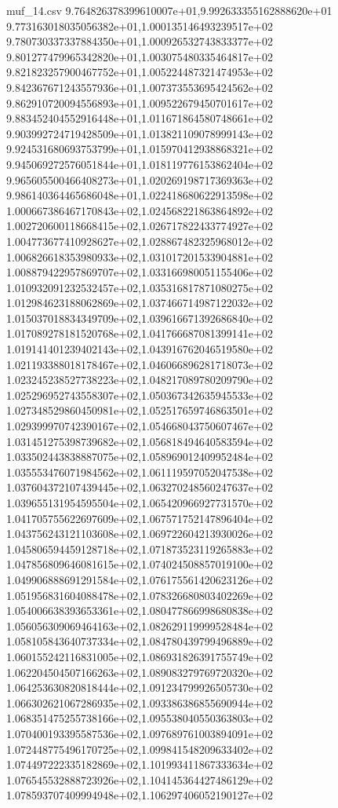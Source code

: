 \begin{filecontents*}{muf_14.csv}
9.764826378399610007e+01,9.992633355162888620e+01
9.773163018035056382e+01,1.000135146493239517e+02
9.780730337337884350e+01,1.000926532743833377e+02
9.801277479965342820e+01,1.003075480335464817e+02
9.821823257900467752e+01,1.005224487321474953e+02
9.842367671243557936e+01,1.007373553695424562e+02
9.862910720094556893e+01,1.009522679450701617e+02
9.883452404552916448e+01,1.011671864580748661e+02
9.903992724719428509e+01,1.013821109078999143e+02
9.924531680693753799e+01,1.015970412938868321e+02
9.945069272576051844e+01,1.018119776153862404e+02
9.965605500466408273e+01,1.020269198717369363e+02
9.986140364465686048e+01,1.022418680622913598e+02
1.000667386467170843e+02,1.024568221863864892e+02
1.002720600118668415e+02,1.026717822433774927e+02
1.004773677410928627e+02,1.028867482325968012e+02
1.006826618353980933e+02,1.031017201533904881e+02
1.008879422957869707e+02,1.033166980051155406e+02
1.010932091232532457e+02,1.035316817871080275e+02
1.012984623188062869e+02,1.037466714987122032e+02
1.015037018834349709e+02,1.039616671392686840e+02
1.017089278181520768e+02,1.041766687081399141e+02
1.019141401239402143e+02,1.043916762046519580e+02
1.021193388018178467e+02,1.046066896281718073e+02
1.023245238527738223e+02,1.048217089780209790e+02
1.025296952743558307e+02,1.050367342635945533e+02
1.027348529860450981e+02,1.052517659746863501e+02
1.029399970742390167e+02,1.054668043750607467e+02
1.031451275398739682e+02,1.056818494640583594e+02
1.033502443838887075e+02,1.058969012409952484e+02
1.035553476071984562e+02,1.061119597052047538e+02
1.037604372107439445e+02,1.063270248560247637e+02
1.039655131954595504e+02,1.065420966927731570e+02
1.041705755622697609e+02,1.067571752147896404e+02
1.043756243121103608e+02,1.069722604213930026e+02
1.045806594459128718e+02,1.071873523119265883e+02
1.047856809646081615e+02,1.074024508857019100e+02
1.049906888691291584e+02,1.076175561420623126e+02
1.051956831604088478e+02,1.078326680803402269e+02
1.054006638393653361e+02,1.080477866998680838e+02
1.056056309069464163e+02,1.082629119999528484e+02
1.058105843640737334e+02,1.084780439799496889e+02
1.060155242116831005e+02,1.086931826391755749e+02
1.062204504507166263e+02,1.089083279769720320e+02
1.064253630820818444e+02,1.091234799926505730e+02
1.066302621067286935e+02,1.093386386855690944e+02
1.068351475255738166e+02,1.095538040550363803e+02
1.070400193395587536e+02,1.097689761003894091e+02
1.072448775496170725e+02,1.099841548209633402e+02
1.074497222335182869e+02,1.101993411867333634e+02
1.076545532888723926e+02,1.104145364427486129e+02
1.078593707409994948e+02,1.106297406052190127e+02

\end{filecontents*}
